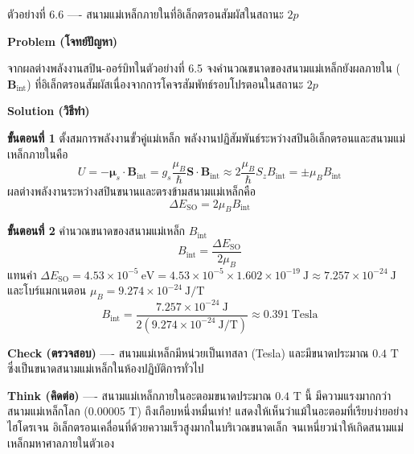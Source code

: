 \begin{psctbox}{ตัวอย่างที่ 6.6 ---- สนามแม่เหล็กภายในที่อิเล็กตรอนสัมผัสในสถานะ $2p$}

\textbf{Problem (โจทย์ปัญหา)}

จากผลต่างพลังงานสปิน-ออร์บิทในตัวอย่างที่ 6.5 จงคำนวณขนาดของสนามแม่เหล็กยังผลภายใน ($\mathbf{B}_{\text{int}}$) ที่อิเล็กตรอนสัมผัสเนื่องจากการโคจรสัมพัทธ์รอบโปรตอนในสถานะ $2p$

\textbf{Solution (วิธีทำ)}

\textbf{ขั้นตอนที่ 1} ตั้งสมการพลังงานขั้วคู่แม่เหล็ก
พลังงานปฏิสัมพันธ์ระหว่างสปินอิเล็กตรอนและสนามแม่เหล็กภายในคือ
\begin{equation*}
U = -\boldsymbol{\mu}_s \cdot \mathbf{B}_{\text{int}} = g_s \frac{\mu_B}{\hbar} \mathbf{S}\cdot\mathbf{B}_{\text{int}} \approx 2 \frac{\mu_B}{\hbar} S_z B_{\text{int}} = \pm \mu_B B_{\text{int}}
\end{equation*}
ผลต่างพลังงานระหว่างสปินขนานและตรงข้ามสนามแม่เหล็กคือ
\begin{equation*}
\Delta E_{\text{SO}} = 2 \mu_B B_{\text{int}}
\end{equation*}

\textbf{ขั้นตอนที่ 2} คำนวณขนาดของสนามแม่เหล็ก $B_{\text{int}}$
\begin{equation*}
B_{\text{int}} = \frac{\Delta E_{\text{SO}}}{2 \mu_B}
\end{equation*}
แทนค่า $\Delta E_{\text{SO}} = 4.53 \times 10^{-5}~\text{eV} = 4.53 \times 10^{-5} \times 1.602 \times 10^{-19}~\text{J} \approx 7.257 \times 10^{-24}~\text{J}$ และโบร์แมกเนตอน $\mu_B = 9.274 \times 10^{-24}~\text{J/T}$
\begin{equation*}
B_{\text{int}} = \frac{7.257 \times 10^{-24}~\text{J}}{2(9.274 \times 10^{-24}~\text{J/T})} \approx 0.391~\text{Tesla}
\end{equation*}

\textbf{Check (ตรวจสอบ)} ---- สนามแม่เหล็กมีหน่วยเป็นเทสลา (Tesla) และมีขนาดประมาณ $0.4\text{ T}$ ซึ่งเป็นขนาดสนามแม่เหล็กในห้องปฏิบัติการทั่วไป

\textbf{Think (คิดต่อ)} ---- สนามแม่เหล็กภายในอะตอมขนาดประมาณ $0.4\text{ T}$ นี้ มีความแรงมากกว่าสนามแม่เหล็กโลก ($0.00005\text{ T}$) ถึงเกือบหนึ่งหมื่นเท่า! แสดงให้เห็นว่าแม้ในอะตอมที่เรียบง่ายอย่างไฮโดรเจน อิเล็กตรอนเคลื่อนที่ด้วยความเร็วสูงมากในบริเวณขนาดเล็ก จนเหนี่ยวนำให้เกิดสนามแม่เหล็กมหาศาลภายในตัวเอง
\end{psctbox}

